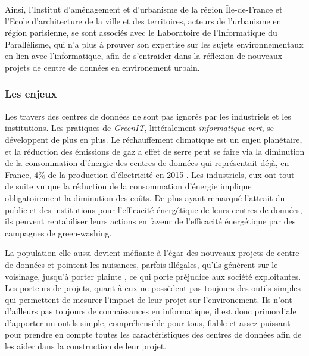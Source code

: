 Ainsi, l'Institut d'aménagement et d'urbanisme de la région Île-de-France et l'Ecole d'architecture de la ville et des territoires, acteurs de l'urbanisme en région parisienne, se sont associés avec le Laboratoire de l'Informatique du Parallélisme, qui n'a plus à prouver son expertise sur les sujets environnementaux en lien avec l'informatique, afin de s'entraider dans la réflexion de nouveaux projets de centre de données en environement urbain.

\subsubsection{Les enjeux}
Les travers des centres de données ne sont pas ignorés par les industriels et les institutions. Les pratiques de \emph{GreenIT}, littéralement \emph{informatique vert}, se développent de plus en plus. Le réchauffement climatique est un enjeu planétaire, et la réduction des émissions de gaz a effet de serre peut se faire via la diminution de la consommation d'énergie des centres de données qui représentait déjà, en France, 4\% de la production d'électricité en 2015 \cite{percentageElectricite}. Les industriels, eux ont tout de suite vu que la réduction de la consommation d'énergie implique obligatoirement la diminution des coûts. De plus ayant remarqué l'attrait du public et des institutions pour l'efficacité énergétique de leurs centres de données, ils peuvent rentabiliser leurs actions en faveur de l'efficacité énergétique par des campagnes de green-washing.

La population elle aussi devient méfiante à l'égar des nouveaux projets de centre de données et pointent les nuisances, parfois illégales, qu'ils génèrent sur le voisinage, jusqu'à porter plainte \cite{plainte}, ce qui porte préjudice aux société exploitantes.\\

Les porteurs de projets, quant-à-eux ne possèdent pas toujours des outils simples qui permettent de mesurer l'impact de leur projet sur l'environement. Ils n'ont d'ailleurs pas toujours de connaissances en informatique, il est donc primordiale d'apporter un outils simple, compréhensible pour tous, fiable et assez puissant pour prendre en compte toutes les caractéristiques des centres de données afin de les aider dans la construction de leur projet.


